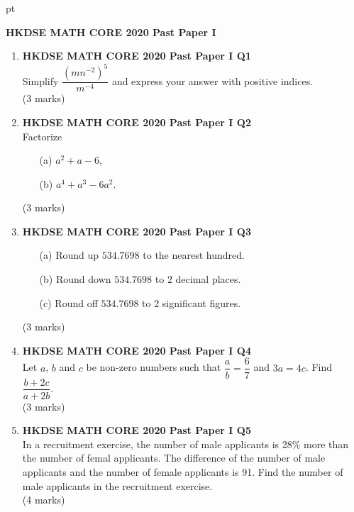 \documentclass[12pt]{article}
\begin{document}
 pt
\begin{center}
	{\large \bf HKDSE MATH CORE 2020 Past Paper I}\\
	\vspace{2 mm}

\end{center}
\vspace{0.05cm}

\begin{enumerate}
	\item \textbf{HKDSE MATH CORE 2020 Past Paper I Q1}\\	
	Simplify $\dfrac{(mn^{-2})^5}{m^{-4}}$ and express your answer with positive indices. \\(3 marks)	

	\item \textbf{HKDSE MATH CORE 2020 Past Paper I Q2}\\
	Factorize
	\begin{enumerate}
		\item[(a)] $a^2 + a - 6$,
		\item[(b)] $a^4 + a^3 - 6a^2$.
	\end{enumerate}
	(3 marks)

	\item \textbf{HKDSE MATH CORE 2020 Past Paper I Q3}
	\begin{enumerate}
		\item[(a)] Round up $534.7698$ to the nearest hundred.
		\item[(b)] Round down $534.7698$ to 2 decimal places.
		\item[(c)] Round off $534.7698$ to 2 significant figures.
	\end{enumerate}
	(3 marks)

	\item \textbf{HKDSE MATH CORE 2020 Past Paper I Q4}\\
	Let $a$, $b$ and $c$ be non-zero numbers such that $\dfrac{a}{b} = \dfrac{6}{7}$ and $3a = 4c$. Find $\dfrac{b + 2c}{a + 2b}$. \\(3 marks)

	\item \textbf{HKDSE MATH CORE 2020 Past Paper I Q5}\\
	In a recruitment exercise, the number of male applicants is 28\% more than the number of femal applicants. The difference of the number of male applicants and the number of female applicants is 91. Find the number of male applicants in the recruitment exercise. \\(4 marks)


\end{enumerate}
\end{document}
